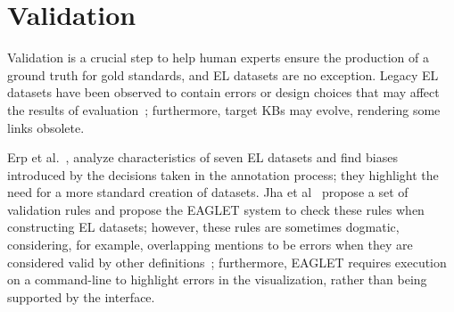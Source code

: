 \documentclass[sigconf]{acmart}
\begin{document}

\section{Validation}

Validation is a crucial step to help human experts ensure the production of a ground truth for gold standards, and EL datasets are no exception. Legacy EL datasets have been observed to contain errors or design choices that may affect the results of evaluation~\cite{Marieke2016,Kunal2017,ourAMW2018}; furthermore, target KBs may evolve, rendering some links obsolete. 

Erp et al.~\cite{Marieke2016}, analyze characteristics of seven EL datasets and find biases introduced by the decisions taken in the annotation process; they highlight the need for a more standard creation of datasets. Jha et al~\cite{Kunal2017} propose a set of validation rules and propose the EAGLET system to check these rules when constructing EL datasets; however, these rules are sometimes dogmatic, considering, for example, overlapping mentions to be errors when they are considered valid by other definitions~\cite{ourAMW2018}; furthermore, EAGLET requires execution on a command-line to highlight errors in the visualization, rather than being supported by the interface.

\end{document}

